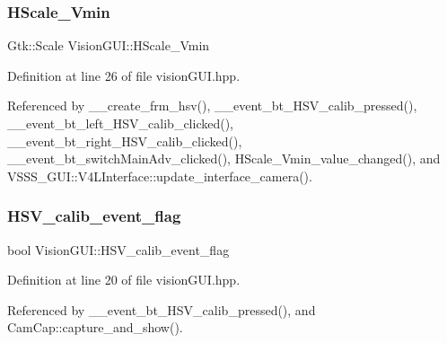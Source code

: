 \mbox{\label{class_vision_g_u_i_a8a1e7f6d4357eceab8e47fe0fb523cf9}} 
\subsubsection{\texorpdfstring{H\+Scale\+\_\+\+Vmin}{HScale\_Vmin}}
{\footnotesize\ttfamily Gtk\+::\+Scale Vision\+G\+U\+I\+::\+H\+Scale\+\_\+\+Vmin}



Definition at line 26 of file vision\+G\+U\+I.\+hpp.



Referenced by \+\_\+\+\_\+create\+\_\+frm\+\_\+hsv(), \+\_\+\+\_\+event\+\_\+bt\+\_\+\+H\+S\+V\+\_\+calib\+\_\+pressed(), \+\_\+\+\_\+event\+\_\+bt\+\_\+left\+\_\+\+H\+S\+V\+\_\+calib\+\_\+clicked(), \+\_\+\+\_\+event\+\_\+bt\+\_\+right\+\_\+\+H\+S\+V\+\_\+calib\+\_\+clicked(), \+\_\+\+\_\+event\+\_\+bt\+\_\+switch\+Main\+Adv\+\_\+clicked(), H\+Scale\+\_\+\+Vmin\+\_\+value\+\_\+changed(), and V\+S\+S\+S\+\_\+\+G\+U\+I\+::\+V4\+L\+Interface\+::update\+\_\+interface\+\_\+camera().

\mbox{\label{class_vision_g_u_i_ac732afeda7552e0c1dc4db8d63633be2}} 
\subsubsection{\texorpdfstring{H\+S\+V\+\_\+calib\+\_\+event\+\_\+flag}{HSV\_calib\_event\_flag}}
{\footnotesize\ttfamily bool Vision\+G\+U\+I\+::\+H\+S\+V\+\_\+calib\+\_\+event\+\_\+flag}



Definition at line 20 of file vision\+G\+U\+I.\+hpp.



Referenced by \+\_\+\+\_\+event\+\_\+bt\+\_\+\+H\+S\+V\+\_\+calib\+\_\+pressed(), and Cam\+Cap\+::capture\+\_\+and\+\_\+show().

\mbox{\label{class_vision_g_u_i_a87c626e284e122d0e95e66277a484dd3}} 
